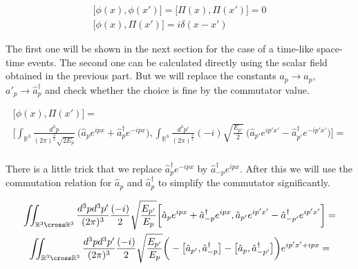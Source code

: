 \begin{equation*}
    \begin{gathered}
        \big[\phi(x), \phi(x')] = \big[\Pi(x), \Pi(x')] = 0 \\
        \big[\phi(x), \Pi(x')] = i \delta(x - x')
    \end{gathered}
\end{equation*}

The first one will be shown in the next section for the case of a time-like space-time events. The second one can be calculated
directly using the scalar field obtained in the previous part. But we will replace the constants $a_{p} \to \hat{a}_{p}$, 
$a'_{p} \to \hat{a}^{\dagger}_{p}$ and check whether the choice is fine by the commutator value.

\begin{equation*}
    \begin{gathered}
        \big[\phi(x), \Pi(x')] = \\
        \bigg[
            \int_{\mathbb{R}^{3}} \frac{d^{3}p}{(2 \pi)^{\frac{3}{2}} \sqrt{2 E_{p}}} \ \big(\hat{a}_{p} e^{i p x} + \hat{a}^{\dagger}_{p} e^{- i p x}\big),
            \int_{\mathbb{R}^{3}} \frac{d^{3}p'}{(2 \pi)^{\frac{3}{2}}} (-i) \sqrt{\frac{E_{p'}}{2}} \ \big(\hat{a}_{p'} e^{i p' x'} - \hat{a}^{\dagger}_{p'} e^{- i p' x'}\big)
        \bigg] = \\
    \end{gathered}
\end{equation*}

There is a little trick that we replace $\hat{a}^{\dagger}_{p} e^{- i p x}$ by $\hat{a}^{\dagger}_{-p} e^{i p x}$. After this we will
use the commutation relation for $\hat{a}_{p}$ and $\hat{a}^{\dagger}_{p}$ to simplify the commutator significantly.

\begin{equation*}
    \begin{gathered}
        \iint_{\mathbb{R}^{3} \cross \mathbb{R}^{3}} \frac{d^{3}p d^{3}p'}{(2 \pi)^{3}} \frac{(-i)}{2} \sqrt{\frac{E_{p'}}{E_{p}}}
        \bigg[
            \hat{a}_{p} e^{i p x} + \hat{a}^{\dagger}_{-p} e^{i p x},
            \hat{a}_{p'} e^{i p' x'} - \hat{a}^{\dagger}_{-p'} e^{i p' x'}
        \bigg] = \\
        \iint_{\mathbb{R}^{3} \cross \mathbb{R}^{3}} \frac{d^{3}p d^{3}p'}{(2 \pi)^{3}} \frac{(-i)}{2} \sqrt{\frac{E_{p'}}{E_{p}}}
        \bigg(
           - \big[ \hat{a}_{p'}, \hat{a}^{\dagger}_{-p} \big]
           - \big[ \hat{a}_{p}, \hat{a}^{\dagger}_{-p'} \big] 
        \bigg) e^{i p' x' + i p x}=
    \end{gathered}
\end{equation*}

